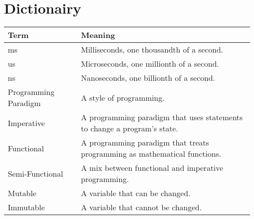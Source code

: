 \onecolumn
\section*{Dictionairy}
\begin{table}[ht]
  \raggedright
  \begin{threeparttable}
    \begin{tabular}{p{4cm}|p{11.5cm}}
      \toprule
      \textbf{Term}         & \textbf{Meaning} \\
      \hline
      ms                    & Milliseconds, one thousandth of a second. \\
      us                    & Microseconds, one millionth of a second. \\
      ns                    & Nanoseconds, one billionth of a second. \\
      Programming Paradigm  & A style of programming. \\
      Imperative            & A programming paradigm that uses statements to change a program's state. \\
      Functional            & A programming paradigm that treats programming as mathematical functions. \\
      Semi-Functional       & A mix between functional and imperative programming. \\
      Mutable               & A variable that can be changed. \\
      Immutable             & A variable that cannot be changed. \\
      \bottomrule
    \end{tabular}
  \end{threeparttable}
\end{table}
\twocolumn
